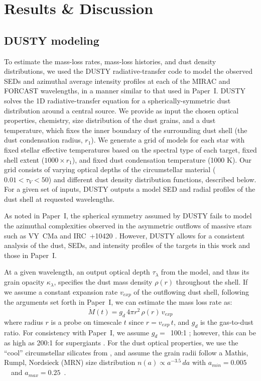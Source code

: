 \documentclass[modern]{aastex61}
\begin{document}
\section{Results \& Discussion}\label{sec:results}
\subsection{DUSTY modeling}\label{sec:dusty}
To estimate the mass-loss rates, mass-loss histories, and dust density distributions, we used the DUSTY radiative-transfer code \citep{ivezic1997} to model the observed SEDs and azimuthal average intensity profiles at each of the MIRAC and FORCAST wavelengths, in a manner similar to that used in Paper~I.  DUSTY solves the 1D radiative-transfer equation for a spherically-symmetric dust distribution around a central source. We provide as input the chosen optical properties, chemistry, size distribution of the dust grains, and a dust temperature, which fixes the inner boundary of the surrounding dust shell (the dust condensation radius, $r_1$). We generate a grid of models for each star with fixed stellar effective temperatures based on the spectral type of each target, fixed shell extent ($1000\times r_1$), and fixed dust condensation temperature (1000 K).  Our grid consists of varying optical depths of the circumstellar material ($0.01 < \tau_V < 50$) and different dust density distribution functions, described below. For a given set of inputs, DUSTY outputs a model SED and radial profiles of the dust shell at requested wavelengths. 

As noted in Paper~I, the spherical symmetry assumed by DUSTY fails to model the azimuthal complexities observed in the asymmetric outflows of massive stars such as VY~CMa \citep{smith2001,humphreys2005,humphreys2007,shenoy2013} and IRC~+10420 \citep{humphreys1997,tiffany2010,shenoy2015}. However, DUSTY allows for a consistent analysis of the dust, SEDs, and intensity profiles of the targets in this work and those in Paper~I.

At a given wavelength, an output optical depth $\tau_\lambda$ from the model, and thus its grain opacity $\kappa_\lambda$, specifies the dust mass density $\rho\left(r\right)$ throughout the shell. If we assume a constant expansion rate $v_{exp}$ of the outflowing dust shell, following the arguments set forth in Paper~I, we can estimate the mass loss rate as:
\[
\dot{M}\left(t\right)=g_d \,4\pi r^2\,\rho\left(r\right)\,v_{exp}
\]
where radius $r$ is a probe on timescale $t$ since $r=v_{exp}\, t$, and $g_d$ is the gas-to-dust ratio. For consistency with Paper~I, we assume $g_d =$~100:1 \citep{knapp1993}; however, this can be as high as 200:1 for supergiants \citep{decin2006,mauron2011}. For the dust optical properties, we use the ``cool'' circumstellar silicates from \citet{ossenkopf1992}, and assume the grain radii follow a Mathis, Rumpl, Nordsieck (MRN) size distribution $n\left(a\right) \propto a^{-3.5}\,da$ \citep{mathis1977} with $a_{min} = 0.005$~\micron\ and $a_{max} = 0.25$~\micron.
\end{document}
